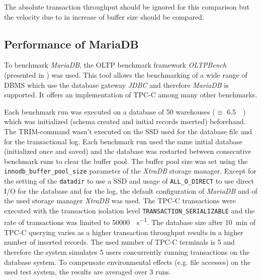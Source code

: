     The absolute transaction throughput should be ignored for this comparison but the velocity due to in increase of buffer size should be compared.

\subsection{Performance of MariaDB}

    To benchmark \emph{MariaDB}, the OLTP benchmark framework \emph{OLTPBench} (presented in \cite{Difallah:2013}) was used. This tool allows the benchmarking of a wide range of DBMS which use the database gateway \emph{JDBC} and therefore \emph{MariaDB} is supported. It offers an implementation of TPC-C among many other benchmarks.

    Each benchmark run was executed on a database of 50 warehouses ($\equiv$ \SI{6.5}{\gibi\byte}) which was initialized (schema created and initial records inserted) beforehand. The TRIM-command wasn't executed on the SSD used for the database file and for the transactional log. Each benchmark run used the same initial database (initialized once and saved) and the database was restarted between consecutive benchmark runs to clear the buffer pool. The buffer pool size was set using the \lstinline{innodb_buffer_pool_size} parameter of the \emph{XtraDB} storage manager. Except for the setting of the \lstinline{datadir} to use a SSD and usage of \lstinline{ALL_O_DIRECT} to use direct I/O for the database and for the log, the default configuration of \emph{MariaDB} and of the used storage manager \emph{XtraDB} was used. The TPC-C transactions were executed with the transaction isolation level \lstinline{TRANSACTION_SERIALIZABLE} and the rate of transactions was limited to \SI{50000}{\transactions\per\second}. The database size after \SI{10}{\minute} of TPC-C querying varies as a higher transaction throughput results in a higher number of inserted records. The used number of TPC-C terminals is 5 and therefore the system simulates 5 users concurrently running transactions on the database system. To compensate environmental effects (e.g. file accesses) on the used test system, the results are averaged over 3 runs.

